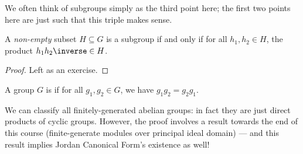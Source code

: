 We often think of subgroups simply as the third point here; the first two points here are just such that this triple makes sense.

\begin{proposition}
    \label{prop:condition-subgroup}%
    A \emph{non-empty} subset \(H \subseteq G\) is a subgroup if and only if for all \(h_1, h_2 \in H\), the product \(h_1 h_2\inverse \in H\).
\end{proposition}

\begin{proof}
    Left as an exercise.
\end{proof}

\begin{definition}
    \label{def:abelian-groups}%
    A group \(G\) is  if for all \(g_1, g_2 \in G\), we have \(g_1 g_2 = g_2 g_1\).
\end{definition}

We can classify all finitely-generated abelian groups: in fact they are just direct products of cyclic groups. However, the proof involves a result towards the end of this course (finite-generate modules over principal ideal domain) --- and this result implies Jordan Canonical Form's existence as well!

